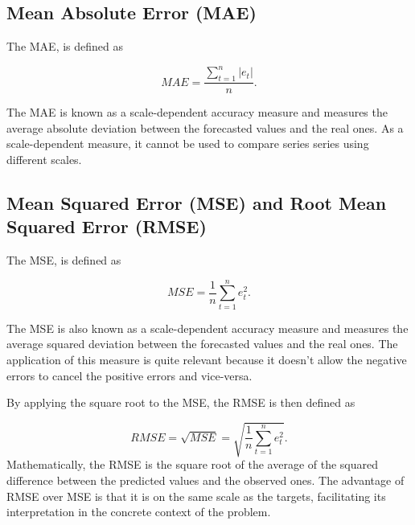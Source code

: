 \subsection{Mean Absolute Error (MAE)}

The \ac{MAE}, is defined as

\begin{equation}
     MAE =\frac {\sum_{t=1}^n|e_t|}{n}.
\label{mae}
\end{equation}

The \ac{MAE} is known as a scale-dependent accuracy measure and measures the average absolute deviation between the forecasted values and the real ones. As a scale-dependent measure, it cannot be used to compare series series using different scales.


\subsection{Mean Squared Error (MSE) and Root Mean Squared Error (RMSE)}

The \ac{MSE}, is defined as

\begin{equation}
     MSE =\frac {1}{n}\sum_{t=1}^ne_t^2.
\label{mse}
\end{equation}

The \ac{MSE} is also known as a scale-dependent accuracy measure and measures the average squared deviation between the forecasted values and the real ones. The application of this measure is quite relevant because it doesn't allow the negative errors to cancel the positive errors and vice-versa. 

By applying the square root to the \ac{MSE}, the \ac{RMSE} is then defined as

\begin{equation}
     RMSE =\sqrt{MSE} = \sqrt{\frac {1}{n}\sum_{t=1}^ne_t^2}.
\label{rmse}
\end{equation}
Mathematically, the \ac{RMSE} is the square root of the average of the squared difference between the predicted values and the observed ones. The advantage of \ac{RMSE} over \ac{MSE} is that it is on the same scale as the targets, facilitating its interpretation in the concrete context of the problem. 

